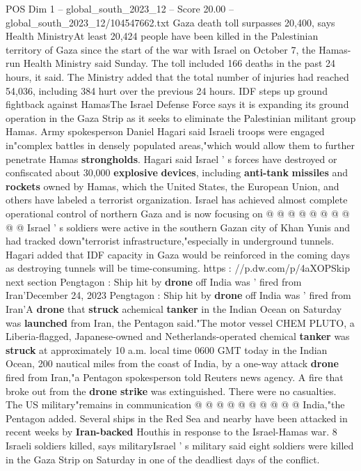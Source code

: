 \begin{textsample}{POS Dim 1 – global\_south\_2023\_12 – Score 20.00 – global\_south\_2023\_12/104547662.txt}  \label{ex:f1_pos_168}
Gaza death toll surpasses 20,400, says Health MinistryAt least 20,424 people have been killed in the Palestinian territory of Gaza since the start of the war with Israel on October 7, the Hamas-run Health Ministry said Sunday.
The toll included 166 deaths in the past 24 hours, it said.
The Ministry added that the total number of injuries had reached 54,036, including 384 hurt over the previous 24 hours.
IDF steps up ground fightback against HamasThe Israel Defense Force says it is expanding its ground operation in the Gaza Strip as it seeks to eliminate the Palestinian militant group Hamas.
Army spokesperson Daniel Hagari said Israeli troops were engaged in"complex battles in densely populated areas,"which would allow them to further penetrate Hamas \textbf{strongholds}.
Hagari said Israel ' s forces have destroyed or confiscated about 30,000 \textbf{explosive} \textbf{devices}, including \textbf{anti-tank} \textbf{missiles} and \textbf{rockets} owned by Hamas, which the United States, the European Union, and others have labeled a terrorist organization.
Israel has achieved almost complete operational control of northern Gaza and is now focusing on @ @ @ @ @ @ @ @ @ @ Israel ' s soldiers were active in the southern Gazan city of Khan Yunis and had tracked down"terrorist infrastructure,"especially in underground tunnels.
Hagari added that IDF capacity in Gaza would be reinforced in the coming days as destroying tunnels will be time-consuming. https : //p.dw.com/p/4aXOPSkip next section Pengtagon : Ship hit by \textbf{drone} off India was ' fired from Iran'December 24, 2023 Pengtagon : Ship hit by \textbf{drone} off India was ' fired from Iran'A \textbf{drone} that \textbf{struck} achemical \textbf{tanker} in the Indian Ocean on Saturday was \textbf{launched} from Iran, the Pentagon said."The motor vessel CHEM PLUTO, a Liberia-flagged, Japanese-owned and Netherlands-operated chemical \textbf{tanker} was \textbf{struck} at approximately 10 a.m. local time 0600 GMT today in the Indian Ocean, 200 nautical miles from the coast of India, by a one-way attack \textbf{drone} fired from Iran,"a Pentagon spokesperson told Reuters news agency.
A fire that broke out from the \textbf{drone} \textbf{strike} was extinguished.
There were no casualties.
The US military"remains in communication @ @ @ @ @ @ @ @ @ @ India,"the Pentagon added.
Several ships in the Red Sea and nearby have been attacked in recent weeks by \textbf{Iran-backed} Houthis in response to the Israel-Hamas war. 8 Israeli soldiers killed, says militaryIsrael ' s military said eight soldiers were killed in the Gaza Strip on Saturday in one of the deadliest days of the conflict.

\end{textsample}
